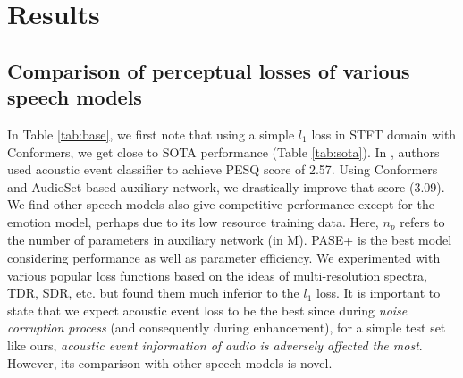 \documentclass{article}
\begin{document}
\begin{table}[t]
\centering
\caption{Comparison of perceptual losses of various speech models with simple $l_1$ loss. $n_p$ refers to \#parameters of auxiliary network.}
\label{tab:base}
\end{table}

\section{Results}
\subsection{Comparison of perceptual losses of various speech models}
In Table \ref{tab:base}, we first note that using a simple $l_1$ loss in STFT domain with Conformers, we get close to \ac{SOTA} performance (Table \ref{tab:sota}).
In \cite{germain2018speech}, authors used acoustic event classifier to achieve \ac{PESQ} score of 2.57.
Using Conformers and AudioSet based auxiliary network, we drastically improve that score (3.09).
We find other speech models also give competitive performance except for the emotion model, perhaps due to its low resource training data.
Here, $n_p$ refers to the number of parameters in auxiliary network (in M).
PASE+ is the best model considering performance as well as parameter efficiency.
We experimented with various popular loss functions based on the ideas of multi-resolution spectra, \ac{TDR}, \ac{SDR}, etc. but found them much inferior to the $l_1$ loss.
It is important to state that we expect acoustic event loss to be the best since during \emph{noise corruption process} (and consequently during enhancement), for a simple test set like ours, \emph{acoustic event information of audio is adversely affected the most}.
However, its comparison with other speech models is novel.
\end{document}
